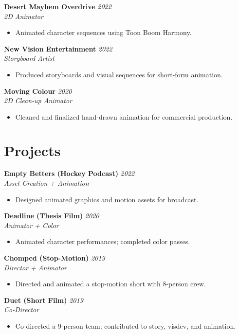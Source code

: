 \documentclass[11pt,letterpaper]{article}
\begin{document}
\textbf{Desert Mayhem Overdrive} \hfill \textit{2022}\\
\textit{2D Animator}
\begin{itemize}
    \item Animated character sequences using Toon Boom Harmony.
\end{itemize}

\textbf{New Vision Entertainment} \hfill \textit{2022}\\
\textit{Storyboard Artist}
\begin{itemize}
    \item Produced storyboards and visual sequences for short-form animation.
\end{itemize}

\textbf{Moving Colour} \hfill \textit{2020}\\
\textit{2D Clean-up Animator}
\begin{itemize}
    \item Cleaned and finalized hand-drawn animation for commercial production.
\end{itemize}

\section{Projects}

\textbf{Empty Betters (Hockey Podcast)} \hfill \textit{2022}\\
\textit{Asset Creation + Animation}
\begin{itemize}
    \item Designed animated graphics and motion assets for broadcast.
\end{itemize}

\textbf{Deadline (Thesis Film)} \hfill \textit{2020}\\
\textit{Animator + Color}
\begin{itemize}
    \item Animated character performances; completed color passes.
\end{itemize}

\textbf{Chomped (Stop-Motion)} \hfill \textit{2019}\\
\textit{Director + Animator}
\begin{itemize}
    \item Directed and animated a stop-motion short with 8-person crew.
\end{itemize}

\textbf{Duet (Short Film)} \hfill \textit{2019}\\
\textit{Co-Director}
\begin{itemize}
    \item Co-directed a 9-person team; contributed to story, visdev, and animation.
\end{itemize}
\end{document}
